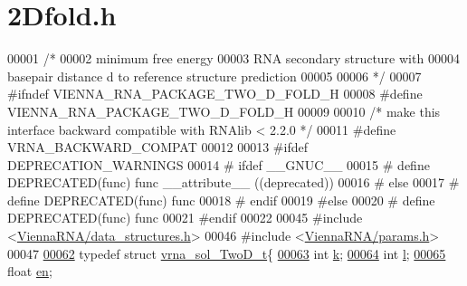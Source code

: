 \hypertarget{2Dfold_8h_source}{}\section{2\+Dfold.h}
\label{2Dfold_8h_source}

\begin{DoxyCode}
00001 \textcolor{comment}{/*}
00002 \textcolor{comment}{      minimum free energy}
00003 \textcolor{comment}{      RNA secondary structure with}
00004 \textcolor{comment}{      basepair distance d to reference structure prediction}
00005 \textcolor{comment}{}
00006 \textcolor{comment}{*/}
00007 \textcolor{preprocessor}{#ifndef VIENNA\_RNA\_PACKAGE\_TWO\_D\_FOLD\_H}
00008 \textcolor{preprocessor}{#define VIENNA\_RNA\_PACKAGE\_TWO\_D\_FOLD\_H}
00009 
00010 \textcolor{comment}{/* make this interface backward compatible with RNAlib < 2.2.0 */}
00011 \textcolor{preprocessor}{#define VRNA\_BACKWARD\_COMPAT}
00012 
00013 \textcolor{preprocessor}{#ifdef DEPRECATION\_WARNINGS}
00014 \textcolor{preprocessor}{# ifdef \_\_GNUC\_\_}
00015 \textcolor{preprocessor}{#  define DEPRECATED(func) func \_\_attribute\_\_ ((deprecated))}
00016 \textcolor{preprocessor}{# else}
00017 \textcolor{preprocessor}{#  define DEPRECATED(func) func}
00018 \textcolor{preprocessor}{# endif}
00019 \textcolor{preprocessor}{#else}
00020 \textcolor{preprocessor}{# define DEPRECATED(func) func}
00021 \textcolor{preprocessor}{#endif}
00022 
00045 \textcolor{preprocessor}{#include <\hyperlink{data__structures_8h}{ViennaRNA/data\_structures.h}>}
00046 \textcolor{preprocessor}{#include <\hyperlink{params_8h}{ViennaRNA/params.h}>}
00047 
\hypertarget{2Dfold_8h_source.tex_l00062}{}\hyperlink{group__kl__neighborhood__mfe}{00062} \textcolor{keyword}{typedef} \textcolor{keyword}{struct }\hyperlink{group__kl__neighborhood__mfe_structvrna__sol__TwoD__t}{vrna\_sol\_TwoD\_t}\{
\hypertarget{2Dfold_8h_source.tex_l00063}{}\hyperlink{group__kl__neighborhood__mfe_ac111e850bb3b3a11b6b5707912cfa1b8}{00063}   \textcolor{keywordtype}{int} \hyperlink{group__kl__neighborhood__mfe_ac111e850bb3b3a11b6b5707912cfa1b8}{k};          
\hypertarget{2Dfold_8h_source.tex_l00064}{}\hyperlink{group__kl__neighborhood__mfe_ab8e95cd920901175a2cc8de726ab1d36}{00064}   \textcolor{keywordtype}{int} \hyperlink{group__kl__neighborhood__mfe_ab8e95cd920901175a2cc8de726ab1d36}{l};          
\hypertarget{2Dfold_8h_source.tex_l00065}{}\hyperlink{group__kl__neighborhood__mfe_a7577863a6a84224dfee39b321c03cab1}{00065}   \textcolor{keywordtype}{float} \hyperlink{group__kl__neighborhood__mfe_a7577863a6a84224dfee39b321c03cab1}{en};       

\end{DoxyCode}

